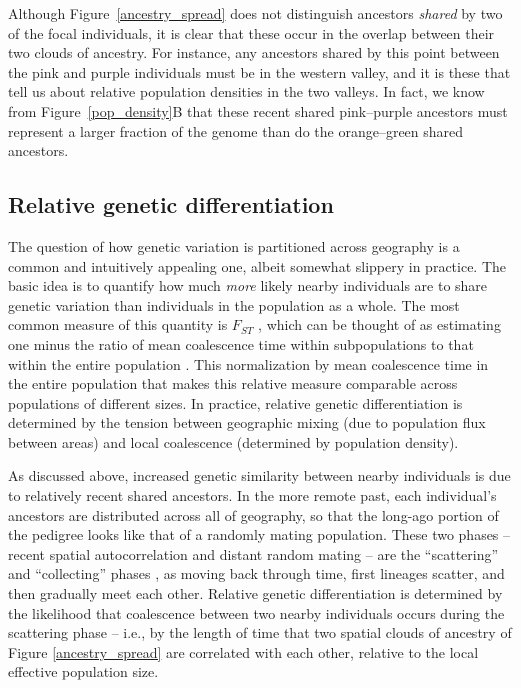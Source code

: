 \documentclass{ar-1col}
\begin{document}
Although Figure~\ref{ancestry_spread} does not distinguish ancestors \textit{shared} by two of the focal individuals,
it is clear that these occur in the overlap between their two clouds of ancestry.
For instance, any ancestors shared by this point between the pink and purple individuals
must be in the western valley,
and it is these that tell us about relative population densities in the two valleys.
In fact, we know from Figure~\ref{pop_density}B that these recent shared pink--purple ancestors
must represent a larger fraction of the genome
than do the orange--green shared ancestors.


\subsection{Relative genetic differentiation}

The question of how genetic variation is partitioned across
geography is a common and intuitively appealing one,
albeit somewhat slippery in practice.
The basic idea is to quantify 
how much \textit{more} likely nearby individuals are 
to share genetic variation than individuals in the population as a whole.
The most common measure of this quantity is $F_{ST}$ \citep{Wright1951},
which can be thought of as estimating
one minus the ratio of mean coalescence time within subpopulations
to that within the entire population \citep{slatkin_1991inbreeding}.
This normalization by mean coalescence time in the entire population
that makes this relative measure comparable across populations of different sizes.
In practice, 
relative genetic differentiation is determined by the tension between 
geographic mixing (due to population flux between areas)
and local coalescence (determined by population density).

As discussed above,
increased genetic similarity between nearby individuals
is due to relatively recent shared ancestors.
In the more remote past, each individual's ancestors are distributed across
all of geography,
so that the long-ago portion of the pedigree looks like that of a randomly mating population.
These two phases -- recent spatial autocorrelation and distant random mating --
are the ``scattering'' and ``collecting'' phases  \citep{Wakeley1999,wilkins2004separationoftimescales},
as moving back through time, first lineages scatter, and then gradually meet each other.
Relative genetic differentiation
is determined by the likelihood that coalescence between two nearby individuals
occurs during the scattering phase
-- i.e., by the length of time that two spatial clouds of ancestry of Figure \ref{ancestry_spread}
are correlated with each other,
relative to the local effective population size.
\end{document}

